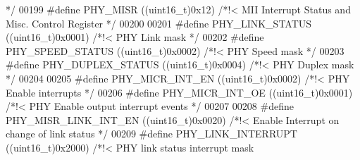 \begin{DoxyCode}
{                 */}
00199 \textcolor{preprocessor}{#}\textcolor{preprocessor}{define} \textcolor{preprocessor}{PHY\_MISR}                        \textcolor{preprocessor}{(}\textcolor{preprocessor}{(}\textcolor{preprocessor}{uint16\_t}\textcolor{preprocessor}{)}0x12\textcolor{preprocessor}{)}    \textcolor{comment}{/*!< MII Interrupt Status and Misc.
       Control Register */}
00200 
00201 \textcolor{preprocessor}{#}\textcolor{preprocessor}{define} \textcolor{preprocessor}{PHY\_LINK\_STATUS}                 \textcolor{preprocessor}{(}\textcolor{preprocessor}{(}\textcolor{preprocessor}{uint16\_t}\textcolor{preprocessor}{)}0x0001\textcolor{preprocessor}{)}  \textcolor{comment}{/*!< PHY Link mask                        
                 */}
00202 \textcolor{preprocessor}{#}\textcolor{preprocessor}{define} \textcolor{preprocessor}{PHY\_SPEED\_STATUS}                \textcolor{preprocessor}{(}\textcolor{preprocessor}{(}\textcolor{preprocessor}{uint16\_t}\textcolor{preprocessor}{)}0x0002\textcolor{preprocessor}{)}  \textcolor{comment}{/*!< PHY Speed mask                       
                 */}
00203 \textcolor{preprocessor}{#}\textcolor{preprocessor}{define} \textcolor{preprocessor}{PHY\_DUPLEX\_STATUS}               \textcolor{preprocessor}{(}\textcolor{preprocessor}{(}\textcolor{preprocessor}{uint16\_t}\textcolor{preprocessor}{)}0x0004\textcolor{preprocessor}{)}  \textcolor{comment}{/*!< PHY Duplex mask                      
                 */}
00204 
00205 \textcolor{preprocessor}{#}\textcolor{preprocessor}{define} \textcolor{preprocessor}{PHY\_MICR\_INT\_EN}                 \textcolor{preprocessor}{(}\textcolor{preprocessor}{(}\textcolor{preprocessor}{uint16\_t}\textcolor{preprocessor}{)}0x0002\textcolor{preprocessor}{)}  \textcolor{comment}{/*!< PHY Enable interrupts                
                 */}
00206 \textcolor{preprocessor}{#}\textcolor{preprocessor}{define} \textcolor{preprocessor}{PHY\_MICR\_INT\_OE}                 \textcolor{preprocessor}{(}\textcolor{preprocessor}{(}\textcolor{preprocessor}{uint16\_t}\textcolor{preprocessor}{)}0x0001\textcolor{preprocessor}{)}  \textcolor{comment}{/*!< PHY Enable output interrupt events   
                 */}
00207 
00208 \textcolor{preprocessor}{#}\textcolor{preprocessor}{define} \textcolor{preprocessor}{PHY\_MISR\_LINK\_INT\_EN}            \textcolor{preprocessor}{(}\textcolor{preprocessor}{(}\textcolor{preprocessor}{uint16\_t}\textcolor{preprocessor}{)}0x0020\textcolor{preprocessor}{)}  \textcolor{comment}{/*!< Enable Interrupt on change of link
       status       */}
00209 \textcolor{preprocessor}{#}\textcolor{preprocessor}{define} \textcolor{preprocessor}{PHY\_LINK\_INTERRUPT}              \textcolor{preprocessor}{(}\textcolor{preprocessor}{(}\textcolor{preprocessor}{uint16\_t}\textcolor{preprocessor}{)}0x2000\textcolor{preprocessor}{)}  \textcolor{comment}{/*!< PHY link status interrupt mask       
}
\end{DoxyCode}
